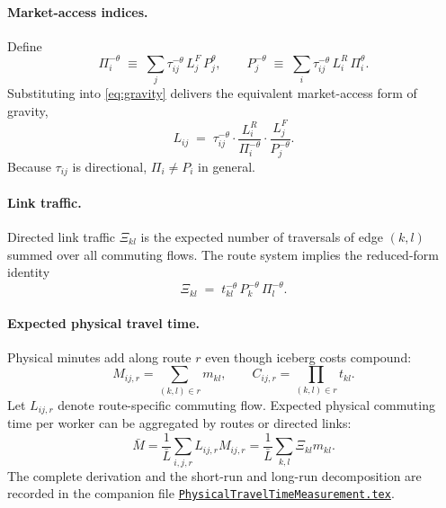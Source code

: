 \documentclass[12pt]{article}
\newcommand{\Lbar}{\bar L}
\newcommand{\tkl}{t_{kl}}
\newcommand{\tijk}{\tau_{ij}}
\begin{document}
\paragraph{Market-access indices.}
Define
\begin{equation}
  \Pi_i^{-\theta}\;\equiv\;\sum_{j}\tijk^{-\theta}\,L_j^F\,P_j^{\theta},
  \qquad
  P_j^{-\theta}\;\equiv\;\sum_{i}\tijk^{-\theta}\,L_i^R\,\Pi_i^{\theta}.
  \label{eq:MA_def}
\end{equation}
Substituting into \eqref{eq:gravity} delivers the equivalent
market-access form of gravity,
\begin{equation}
  L_{ij}\;=\;\tijk^{-\theta}\cdot
  \frac{L_i^R}{\Pi_i^{-\theta}}\cdot
  \frac{L_j^F}{P_j^{-\theta}}.
  \label{eq:gravity_MA}
\end{equation}
Because $\tijk$ is directional, $\Pi_i\ne P_i$ in general.

\paragraph{Link traffic.}
Directed link traffic $\Xi_{kl}$ is the expected number of traversals
of edge $(k,l)$ summed over all commuting flows.  The route system
implies the reduced-form identity
\begin{equation}
  \Xi_{kl}\;=\;\tkl^{-\theta}\,P_k^{-\theta}\,\Pi_l^{-\theta}.
  \label{eq:xi_gravity}
\end{equation}

\paragraph{Expected physical travel time.}
Physical minutes add along route $r$ even though iceberg costs compound:
\begin{equation}
  M_{ij,r}=\sum_{(k,l)\in r}m_{kl},
  \qquad
  C_{ij,r}=\prod_{(k,l)\in r}t_{kl}.
  \label{eq:physical_route_time}
\end{equation}
Let $L_{ij,r}$ denote route-specific commuting flow. Expected physical
commuting time per worker can be aggregated by routes or directed links:
\begin{equation}
  \bar M
  =\frac{1}{\Lbar}\sum_{i,j,r}L_{ij,r}M_{ij,r}
  =\frac{1}{\Lbar}\sum_{k,l}\Xi_{kl}m_{kl}.
  \label{eq:average_physical_time}
\end{equation}
The complete derivation and the short-run and long-run decomposition are
recorded in the companion file
\href{run:./PhysicalTravelTimeMeasurement.pdf}{\texttt{PhysicalTravelTimeMeasurement.tex}}.
\end{document}
